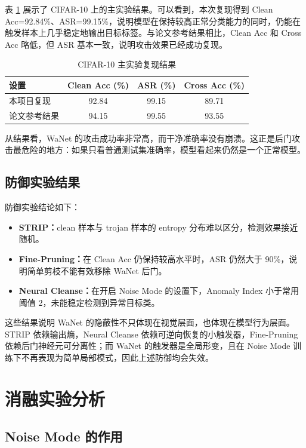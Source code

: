 \documentclass[UTF8,zihao=-4]{ctexart}
\begin{document}
表 \ref{tab:main} 展示了 CIFAR-10 上的主实验结果。可以看到，本次复现得到 Clean Acc=92.84\%、ASR=99.15\%，说明模型在保持较高正常分类能力的同时，仍能在触发样本上几乎稳定地输出目标标签。与论文参考结果相比，Clean Acc 和 Cross Acc 略低，但 ASR 基本一致，说明攻击效果已经成功复现。

\begin{table}[H]
\centering
\caption{CIFAR-10 主实验复现结果}
\label{tab:main}
\begin{tabular}{lccc}
\toprule
设置 & Clean Acc (\%) & ASR (\%) & Cross Acc (\%) \\
\midrule
本项目复现 & 92.84 & 99.15 & 89.71 \\
论文参考结果 & 94.15 & 99.55 & 93.55 \\
\bottomrule
\end{tabular}
\end{table}

从结果看，WaNet 的攻击成功率非常高，而干净准确率没有崩溃。这正是后门攻击最危险的地方：如果只看普通测试集准确率，模型看起来仍然是一个正常模型。

\subsection{防御实验结果}

防御实验结论如下：
\begin{itemize}
    \item \textbf{STRIP：}clean 样本与 trojan 样本的 entropy 分布难以区分，检测效果接近随机。
    \item \textbf{Fine-Pruning：}在 Clean Acc 仍保持较高水平时，ASR 仍然大于 90\%，说明简单剪枝不能有效移除 WaNet 后门。
    \item \textbf{Neural Cleanse：}在开启 Noise Mode 的设置下，Anomaly Index 小于常用阈值 2，未能稳定检测到异常目标类。
\end{itemize}

这些结果说明 WaNet 的隐蔽性不只体现在视觉层面，也体现在模型行为层面。STRIP 依赖输出熵，Neural Cleanse 依赖可逆向恢复的小触发器，Fine-Pruning 依赖后门神经元可分离性；而 WaNet 的触发器是全局形变，且在 Noise Mode 训练下不再表现为简单局部模式，因此上述防御均会失效。

\section{消融实验分析}

\subsection{Noise Mode 的作用}
\end{document}
